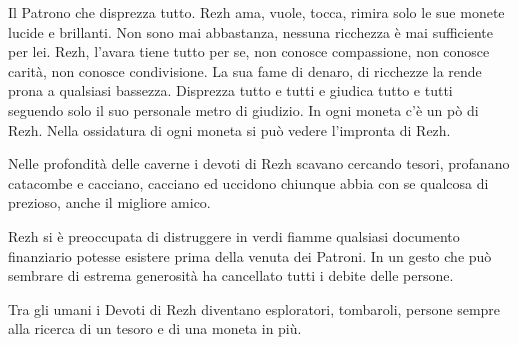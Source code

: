 \begin{multicols}{2}
Il Patrono che disprezza tutto. Rezh ama, vuole, tocca, rimira solo le sue monete lucide e brillanti. Non sono mai abbastanza, nessuna ricchezza è mai sufficiente per lei. Rezh, l'avara tiene tutto per se, non conosce compassione, non conosce carità, non conosce condivisione. La sua fame di denaro, di ricchezze la rende prona a qualsiasi bassezza. Disprezza tutto e tutti e giudica tutto e tutti seguendo solo il suo personale metro di giudizio. In ogni moneta c'è un pò di Rezh. Nella ossidatura di ogni moneta si può vedere l'impronta di Rezh.

Nelle profondità delle caverne i devoti di Rezh scavano cercando tesori, profanano catacombe e cacciano, cacciano ed uccidono chiunque abbia con se qualcosa di prezioso, anche il migliore amico.

Rezh si è preoccupata di distruggere in verdi fiamme qualsiasi documento finanziario potesse esistere prima della venuta dei Patroni. In un gesto che può sembrare di estrema generosità ha cancellato tutti i debite delle persone.

Tra gli umani i Devoti di Rezh diventano esploratori, tombaroli, persone sempre alla ricerca di un tesoro e di una moneta in più.




\end{multicols}
